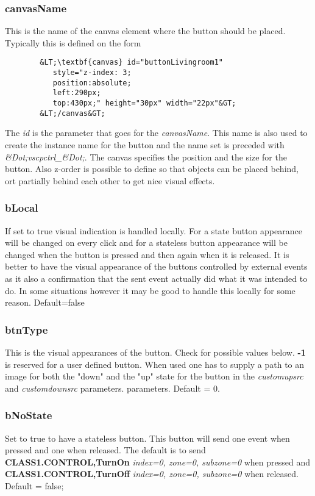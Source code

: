 \documentclass{article}
\begin{document}
        \subsubsection*{canvasName}
        This is the name of the canvas element where the button should be placed.
        Typically this is defined on the form
        \begin{verbatim}
        &LT;\textbf{canvas} id="buttonLivingroom1"
           style="z-index: 3;
           position:absolute;
           left:290px;
           top:430px;" height="30px" width="22px"&GT;
        &LT;/canvas&GT;   
        \end{verbatim}     
        The \textit{id} is the parameter that goes for the \textit{canvasName}. This
        name is also used to create the instance name for the button and the name
        set is preceded with \textit{\&Dot;vscpctrl\_\&Dot;}. The canvas specifies the
        position and the size for the button. Also z-order is possible to define 
        so that objects can be placed behind, ort partially behind each other
        to get nice visual effects.
        \subsubsection*{bLocal}
        If set to true visual indication is handled locally. For a state button
        appearance will be changed on every click and for a stateless button
        appearance will be changed when the button is pressed and then again when 
        it is released. It is better to have the visual appearance of the buttons
        controlled by external events as it also a confirmation that the sent event 
        actually did what it was intended to do. In some situations however it may be
        good to handle this locally for some reason. Default=false
        \subsubsection*{btnType}
        This is the visual appearances of the button. Check for possible values 
        below. \textbf{-1} is reserved for a user defined button. When used one has
        to supply a path to an image for both the "down" and the "up" state for the
        button in the \textit{customupsrc} and \textit{customdownsrc} parameters.
        parameters. Default = 0.
        \subsubsection*{bNoState}
        Set to true to have a stateless button. This button will send one event
        when pressed and one when released. The default is to send \textbf{CLASS1.CONTROL,TurnOn} 
        \textit{index=0, zone=0, subzone=0} when 
        pressed and \textbf{CLASS1.CONTROL,TurnOff} \textit{index=0, zone=0, subzone=0} when released.
        Default = false;
\end{document}
